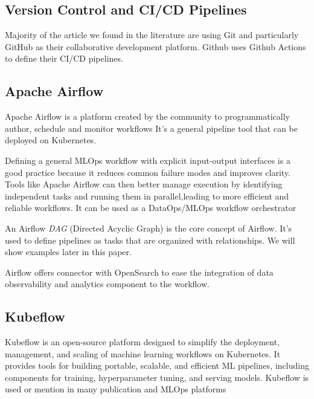 \subsection{Version Control and CI/CD Pipelines}\label{subsec:version-control-and-ci/cd-pipelines}
Majority of the article we found in the literature are using Git and particularly GitHub\cite{github} as their collaborative development platform.
Github uses Github Actions to define their CI/CD pipelines.

\subsection{Apache Airflow}\label{subsec:apache-airflow}
Apache Airflow\cite{airflow} is a platform created by the community to programmatically author, schedule and monitor workflows\cite{airflow}
It's a general pipeline tool that can be deployed on Kubernetes.

Defining a general MLOps workflow with explicit input-output interfaces is a good practice because it reduces common failure modes and improves clarity.
Tools like Apache Airflow can then better manage execution by identifying independent tasks and running them in parallel,leading to more efficient and reliable workflows.\cite{mlflow}
It can be used as a DataOps/MLOps workflow orchestrator\cite{10245408,mlflow}

An Airflow \textit{DAG} (Directed Acyclic Graph) is the core concept of Airflow\cite{airflow}.
It's used to define pipelines as tasks that are organized with relationships.
We will show examples later in this paper.

Airflow offers connector with OpenSearch to ease the integration of data observability and analytics component to the workflow.

\subsection{Kubeflow}\label{subsec:kubeflow2}
Kubeflow\cite{Kubeflow} is an open-source platform designed to simplify the deployment, management, and scaling of machine learning workflows on Kubernetes.
It provides tools for building portable, scalable, and efficient ML pipelines, including components for training, hyperparameter tuning, and serving models.
Kubeflow is used or mention in many publication and MLOps platforms\cite{inproceedings,10855428}

